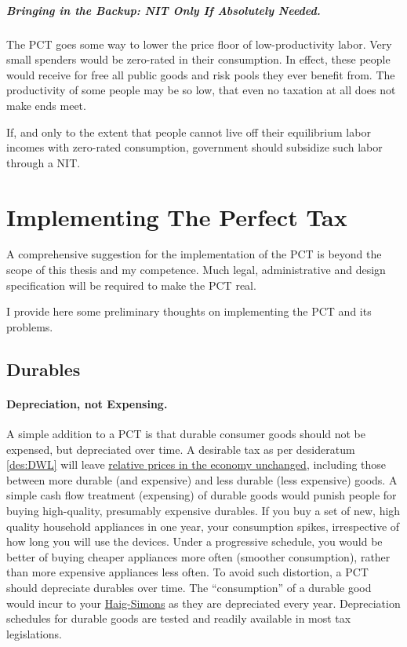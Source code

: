 \subparagraph{Bringing in the Backup: NIT Only If Absolutely Needed.} The PCT goes some way to lower the price floor of low-productivity labor. Very small spenders would be zero-rated in their consumption. In effect, these people would receive for free all public goods and risk pools they ever benefit from. The productivity of some people may be so low, that even no taxation at all does not make ends meet.

If, and only to the extent that people cannot live off their equilibrium labor incomes with zero-rated consumption, government should subsidize such labor through a NIT.

\section{Implementing The Perfect Tax} \label{sec:Implementation} A comprehensive suggestion for the implementation of the PCT is beyond the scope of this thesis and my competence. Much legal, administrative and design specification will be required to make the PCT real.

I provide here some preliminary thoughts on implementing the PCT and its problems.

\subsection{Durables}
\paragraph{Depreciation, not Expensing.} A simple addition to a PCT is that durable consumer goods should not be expensed, but depreciated over time. A desirable tax as per desideratum \ref{des:DWL} will leave \hyperref[des:DWL]{relative prices in the economy unchanged}, including those between more durable (and expensive) and less durable (less expensive) goods. A simple cash flow treatment (expensing) of durable goods would punish people for buying high-quality, presumably expensive durables. If you buy a set of new, high quality household appliances in one year, your consumption spikes, irrespective of how long you will use the devices. Under a progressive schedule, you would be better of buying cheaper appliances more often (smoother consumption), rather than more expensive appliances less often. To avoid such distortion, a PCT should depreciate durables over time. The ``consumption'' of a durable good would incur to your \hyperref[eq:HaigSimonsPCT]{Haig-Simons} as they are depreciated every year. Depreciation schedules for durable goods are tested and readily available in most tax legislations. %

